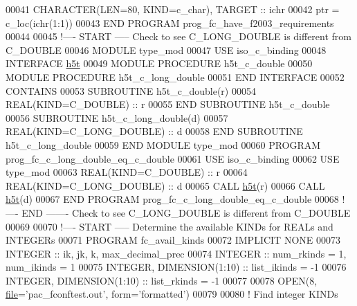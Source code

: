 \begin{DoxyCode}
00041   \textcolor{keywordtype}{CHARACTER(LEN=80, KIND=c\_char)}, \textcolor{keywordtype}{TARGET} :: ichr
00042   ptr = c\_loc(ichr(1:1))
00043 \textcolor{keyword}{END PROGRAM }prog\_fc\_have\_f2003\_requirements
00044 
00045 \textcolor{comment}{!---- START ----- Check to see C\_LONG\_DOUBLE is different from C\_DOUBLE}
00046 \textcolor{keyword}{MODULE} type\_mod
00047   \textcolor{keywordtype}{USE }iso\_c\_binding
00048   \textcolor{keyword}{INTERFACE} \hyperlink{interfacetype__mod_1_1h5t}{h5t}  
00049      \textcolor{keyword}{MODULE PROCEDURE} h5t\_c\_double
00050      \textcolor{keyword}{MODULE PROCEDURE} h5t\_c\_long\_double
00051 \textcolor{keyword}{  END INTERFACE}
00052 \textcolor{keyword}{CONTAINS}
00053 \textcolor{keyword}{  SUBROUTINE }h5t\_c\_double(r)
00054     \textcolor{keywordtype}{REAL(KIND=C\_DOUBLE)} :: r
00055 \textcolor{keyword}{  END SUBROUTINE }h5t\_c\_double
00056 \textcolor{keyword}{  SUBROUTINE }h5t\_c\_long\_double(d)
00057     \textcolor{keywordtype}{REAL(KIND=C\_LONG\_DOUBLE)} :: d
00058 \textcolor{keyword}{  END SUBROUTINE }h5t\_c\_long\_double
00059 \textcolor{keyword}{END MODULE }type\_mod
00060 \textcolor{keyword}{PROGRAM} prog\_fc\_c\_long\_double\_eq\_c\_double
00061   \textcolor{keywordtype}{USE }iso\_c\_binding
00062   \textcolor{keywordtype}{USE }type\_mod
00063   \textcolor{keywordtype}{REAL(KIND=C\_DOUBLE)}      :: r
00064   \textcolor{keywordtype}{REAL(KIND=C\_LONG\_DOUBLE)} :: d
00065   \textcolor{keyword}{CALL }\hyperlink{interfacetype__mod_1_1h5t}{h5t}(r)
00066   \textcolor{keyword}{CALL }\hyperlink{interfacetype__mod_1_1h5t}{h5t}(d)
00067 \textcolor{keyword}{END PROGRAM }prog\_fc\_c\_long\_double\_eq\_c\_double
00068 \textcolor{comment}{!---- END ------- Check to see C\_LONG\_DOUBLE is different from C\_DOUBLE}
00069 
00070 \textcolor{comment}{!---- START ----- Determine the available KINDs for REALs and INTEGERs}
00071 \textcolor{keyword}{PROGRAM} fc\_avail\_kinds
00072       \textcolor{keywordtype}{IMPLICIT NONE}
00073       \textcolor{keywordtype}{INTEGER} :: ik, jk, k, max\_decimal\_prec
00074       \textcolor{keywordtype}{INTEGER} :: num\_rkinds = 1, num\_ikinds = 1
00075       \textcolor{keywordtype}{INTEGER}, \textcolor{keywordtype}{DIMENSION(1:10)} :: list\_ikinds = -1
00076       \textcolor{keywordtype}{INTEGER}, \textcolor{keywordtype}{DIMENSION(1:10)} :: list\_rkinds = -1
00077   
00078       \textcolor{keyword}{OPEN}(8, \hyperlink{structfile}{file}=\textcolor{stringliteral}{'pac\_fconftest.out'}, form=\textcolor{stringliteral}{'formatted'})
00079 
00080       \textcolor{comment}{! Find integer KINDs}

\end{DoxyCode}
